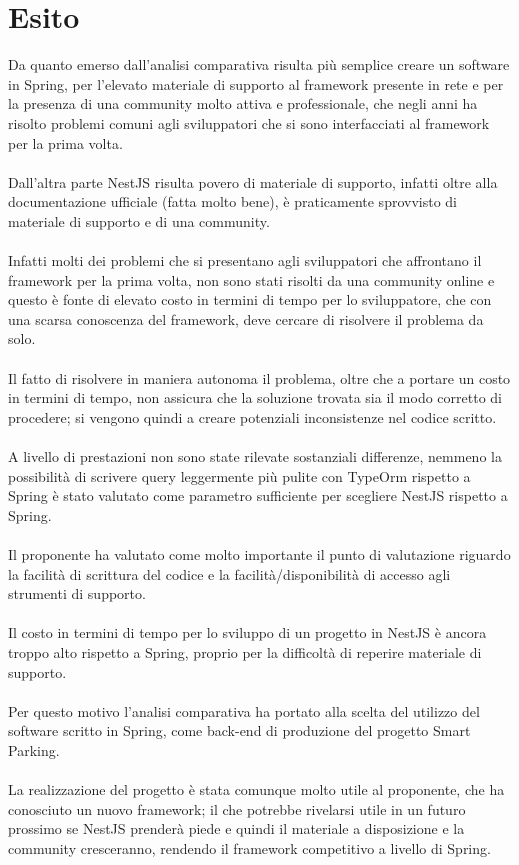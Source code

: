 \section{Esito}
Da quanto emerso dall'analisi comparativa risulta più semplice creare un software in Spring, per l'elevato materiale di
supporto al framework presente in rete e per la presenza di una community molto attiva e professionale, che negli
anni ha risolto problemi comuni agli sviluppatori che si sono interfacciati al framework per la prima volta. 
\\\\
Dall'altra parte NestJS risulta povero di materiale di supporto, infatti oltre alla documentazione ufficiale (fatta molto
bene), è praticamente sprovvisto di materiale di supporto e di una community.
\\\\
Infatti molti dei problemi che si presentano agli sviluppatori che affrontano il framework per la prima volta, non sono
stati risolti da una community online e questo è fonte di elevato costo in termini di tempo per lo sviluppatore, che con 
una scarsa conoscenza del framework, deve cercare di risolvere il problema da solo.
\\\\
Il fatto di risolvere in maniera autonoma il problema, oltre che a portare un costo in termini di tempo, non assicura 
che la soluzione trovata sia il modo corretto di procedere; si vengono quindi a creare potenziali inconsistenze nel codice
scritto.
\\\\
A livello di prestazioni non sono state rilevate sostanziali differenze, nemmeno la possibilità di scrivere query 
leggermente più pulite con TypeOrm rispetto a Spring è stato valutato come parametro sufficiente per scegliere 
NestJS rispetto a Spring.
\\\\
Il proponente ha valutato come molto importante il punto di valutazione riguardo la facilità di scrittura del codice
e la facilità/disponibilità di accesso agli strumenti di supporto.
\\\\
Il costo in termini di tempo per lo sviluppo di un progetto in NestJS è ancora troppo alto rispetto a Spring, proprio
per la difficoltà di reperire materiale di supporto.
\\\\
Per questo motivo l'analisi comparativa ha portato alla scelta del utilizzo del software scritto in Spring, come back-end
di produzione del progetto Smart Parking.
\\\\
La realizzazione del progetto è stata comunque molto utile al proponente, che ha conosciuto un nuovo
framework; il che potrebbe rivelarsi utile in un futuro prossimo se NestJS prenderà piede e quindi il materiale a 
disposizione e la community cresceranno, rendendo il framework competitivo a livello di Spring.